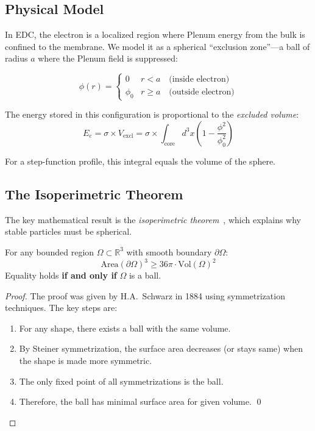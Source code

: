 \subsection{Physical Model}

In EDC, the electron is a localized region where Plenum energy from the bulk is confined
to the membrane. We model it as a spherical ``exclusion zone''---a ball of radius $a$
where the Plenum field is suppressed:

\begin{equation}
\phi(r) = \begin{cases}
0 & r < a \quad \text{(inside electron)} \\
\phi_0 & r \geq a \quad \text{(outside electron)}
\end{cases}
\label{eq:ch2_electron_profile}
\end{equation}

The energy stored in this configuration is proportional to the \emph{excluded volume}:
\begin{equation}
E_e = \sigma \times V_{\text{excl}} = \sigma \times \int_{\text{core}} d^3x \left(1 - \frac{\phi^2}{\phi_0^2}\right)
\label{eq:ch2_electron_energy}
\end{equation}

For a step-function profile, this integral equals the volume of the sphere.

\subsection{The Isoperimetric Theorem}

The key mathematical result is the \emph{isoperimetric theorem}~\cite{Osserman1978}, which
explains why stable particles must be spherical.

\begin{theorem}
\label{thm:ch2_isoperimetric}
\tagM{}
For any bounded region $\Omega \subset \mathbb{R}^3$ with smooth boundary $\partial\Omega$:
\begin{equation}
\mathrm{Area}(\partial\Omega)^3 \geq 36\pi \cdot \mathrm{Vol}(\Omega)^2
\label{eq:ch2_isoperimetric}
\end{equation}
Equality holds \textbf{if and only if} $\Omega$ is a ball.
\end{theorem}

\begin{proof}
The proof was given by H.A.\ Schwarz in 1884 using symmetrization techniques. The key steps are:
\begin{enumerate}
    \item For any shape, there exists a ball with the same volume.
    \item By Steiner symmetrization, the surface area decreases (or stays same) when the
          shape is made more symmetric.
    \item The only fixed point of all symmetrizations is the ball.
    \item Therefore, the ball has minimal surface area for given volume. \qed
\end{enumerate}
\end{proof}

